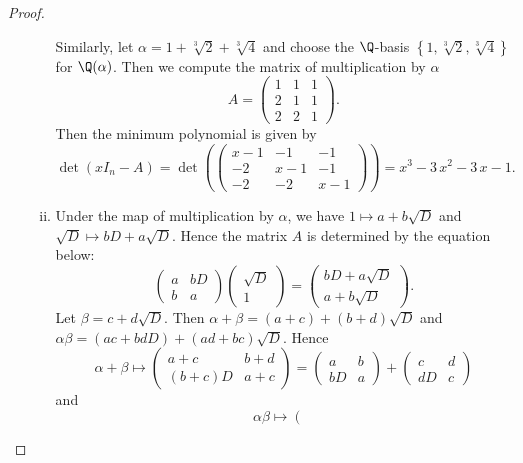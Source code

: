 \documentclass[10pt]{amsart}
\begin{document}
\begin{thm}
\begin{proof}
\begin{enumerate}[(a)]
\begin{enumerate}[(i)]
    Similarly, let $\alpha = 1 + \sqrt[3]{2} + \sqrt[3]{4}$ and choose the $\Q$-basis $\left\{1,\sqrt[3]{2},\sqrt[3]{4}\right\}$ for $\Q(\alpha)$.
    Then we compute the matrix of multiplication by $\alpha$
    $$A = \left(\begin{array}{rrr}
      1 & 1 & 1 \\
      2 & 1 & 1 \\
      2 & 2 & 1
    \end{array}\right).$$
    Then the minimum polynomial is given by
    $$\det(xI_n - A) = \operatorname{det}\left(\left(\begin{array}{rrr}
      x - 1 & -1 & -1 \\
      -2 & x - 1 & -1 \\
      -2 & -2 & x - 1
    \end{array}\right)\right) = x^{3} - 3 \, x^{2} - 3 \, x - 1.$$
  \item
    Under the map of multiplication by $\alpha$, we have $1 \mapsto a + b\sqrt{D}$ and $\sqrt{D} \mapsto bD + a\sqrt{D}$.
    Hence the matrix $A$ is determined by the equation below:
    $$\left(\begin{array}{cc}
      a & bD\\
      b & a
    \end{array}\right)
    \left(\begin{array}{c}
      \sqrt{D}\\
      1
    \end{array}\right) = \left(\begin{array}{c}
      bD + a\sqrt{D}\\
      a + b\sqrt{D}
      \end{array}\right).$$
    Let $\beta = c + d\sqrt{D}$.
    Then $\alpha + \beta = (a + c) + (b + d)\sqrt{D}$ and $\alpha\beta = (ac + bdD) + (ad + bc)\sqrt{D}$.
    Hence 
    $$\alpha + \beta \mapsto \left(\begin{array}{cc}
      a+c & b + d\\
      (b + c)D & a + c
    \end{array}\right) = 
    \left(\begin{array}{cc}
      a & b\\
      bD & a
    \end{array}\right) +
    \left(\begin{array}{cc}
      c & d\\
      dD & c
    \end{array}\right)$$
    and
    $$\alpha\beta \mapsto \left(\begin{array}{cc}

\end{array}$$
\end{enumerate}
\end{enumerate}
\end{proof}
\end{thm}
\end{document}
